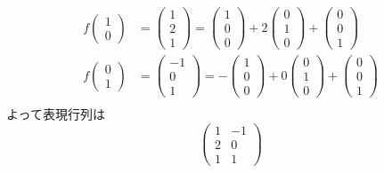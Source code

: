 \begin{ans}
\begin{align*}
f\begin{pmatrix}1 \\ 0\end{pmatrix} &= \begin{pmatrix}1 \\ 2 \\ 1\end{pmatrix} = \begin{pmatrix}1 \\ 0 \\ 0\end{pmatrix} + 2\begin{pmatrix}0 \\ 1 \\ 0\end{pmatrix} + \begin{pmatrix}0 \\ 0 \\ 1\end{pmatrix}\\
f\begin{pmatrix}0 \\ 1\end{pmatrix} &= \begin{pmatrix}-1 \\ 0 \\ 1\end{pmatrix} = -\begin{pmatrix}1 \\ 0 \\ 0\end{pmatrix} + 0\begin{pmatrix}0 \\ 1 \\ 0\end{pmatrix} + \begin{pmatrix}0 \\ 0 \\ 1\end{pmatrix}\\
\end{align*}
よって表現行列は
\[\begin{pmatrix}1 & -1 \\ 2 & 0 \\ 1 & 1\end{pmatrix}\]
\end{ans}


